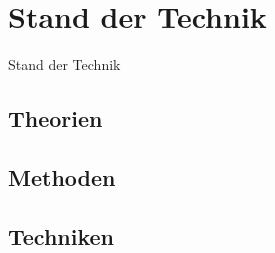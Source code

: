 \chapter{Stand der Technik}
\label{chap:technikStand}
Stand der Technik
\section{Theorien}
\section{Methoden}
\section{Techniken}
